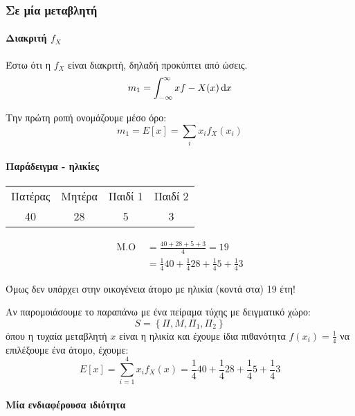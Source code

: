 \documentclass[11pt,a4paper,notitlepage,fleqn,draft]{article}
\begin{document}
\subsubsection{Σε μία μεταβλητή}

\paragraph{Διακριτή \( f_X \)}
Έστω ότι η \( f_X \) είναι διακριτή, δηλαδή προκύπτει από ώσεις.
\[
m_1 = \int_{-\infty}^{\infty} xf-X(x)\mathop{}\!\mathrm{d} x
\]

Την πρώτη ροπή ονομάζουμε μέσο όρο:
\[
m_1 = E[x] = \sum_{i} x_i f_X(x_i)
\]

\paragraph{Παράδειγμα - ηλικίες}
\begin{tabular}{cccc}
	Πατέρας & Μητέρα & Παιδί 1 & Παιδί 2 \\ 
	40 & 28 & 5 & 3 \\ 
	\end{tabular}
\begin{align*}
\text{Μ.Ο } &= \frac{40+28+5+3}{4} = 19
\\ &= \frac{1}{4}40 + \frac{1}{4}28 + \frac{1}{4}5
+ \frac{1}{4}3
\end{align*}

Όμως δεν υπάρχει στην οικογένεια άτομο με ηλικία (κοντά στα) 19 έτη!

Αν παρομοιάσουμε το παραπάνω με ένα πείραμα τύχης με δειγματικό
χώρο:
\[
S = \left\lbrace \varPi, M, \varPi_1, \varPi_2 \right\rbrace
\]
όπου η τυχαία μεταβλητή \( x \) είναι η ηλικία και έχουμε ίδια
πιθανότητα \( f(x_i) = \frac{1}{4} \) να επιλέξουμε ένα άτομο,
έχουμε:
\[
E[x] = \sum_{i=1}^{4} x_if_X(x) = \frac{1}{4}40 + \frac{1}{4}28 + \frac{1}{4}5 + \frac{1}{4}3
\]
\paragraph{Μία ενδιαφέρουσα ιδιότητα}\hspace{0pt}\par
{}
\end{document}
